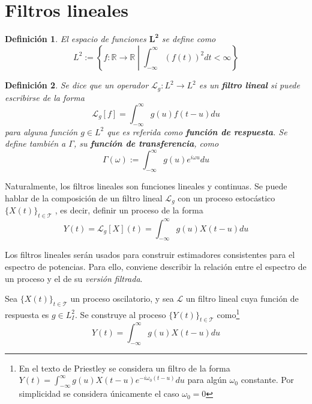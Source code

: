 \documentclass[12pt,letterpaper]{book}
\newtheorem{definicion}{Definición}[chapter]
\newcommand{\R}{\mathbb{R}}
\newcommand{\intR}{\int_{-\infty}^{\infty}}
\newcommand{\xt}{$\{X(t)\}_{t\in \mathcal{T}}$ }
\newcommand{\talque}{\mathrel{}\middle|\mathrel{}}
\newcommand{\lldos}{L^{2}_I}
\begin{document}
\section{Filtros lineales}
\label{sec:lazy_filtros}

\begin{definicion}
El espacio de funciones $\boldsymbol{L}^{\boldsymbol{2}}$ se define como
\begin{equation}
L^2 := \left\{ f:\R\rightarrow\R \talque \intR \left( f(t) \right)^2 dt < \infty \right\}
\end{equation}
\end{definicion}

\begin{definicion}
Se dice que un operador $\mathcal{L}_g : L^{2} \rightarrow L^{2}$ es un \textbf{filtro lineal} si puede escribirse de la forma
\begin{equation}
\mathcal{L}_g[f] = \intR g(u) f(t-u) du
\end{equation}
para alguna función $g\in L^{2}$ que es referida como \textbf{función de respuesta}. Se define también a $\Gamma$, su \textbf{función de transferencia}, como
\begin{equation}
\Gamma (\omega) := \intR g(u) e^{i \omega u} du
\end{equation}
\end{definicion}

Naturalmente, los filtros lineales son funciones lineales y continuas. 
%
%
%
Se puede hablar de la composición de un filtro lineal $\mathcal{L}_g$ con un proceso estocástico \xt, es decir, definir un proceso de la forma
\begin{equation}
Y(t) = \mathcal{L}_g[X](t) =  \intR g(u) X(t-u) du
\label{eq:filtrado}
\end{equation}

Los filtros lineales serán usados para construir estimadores consistentes para el espectro de potencias.
%
Para ello, conviene describir la relación entre el espectro de un proceso y el de su \textit{versión filtrada}.

Sea \xt un proceso oscilatorio, y sea $\mathcal{L}$ un filtro lineal cuya función de respuesta es $g\in \lldos$.
Se construye al proceso $\{Y(t)\}_{t\in \mathcal{T}}$ como\footnote{En el texto de Priestley se considera un filtro de la forma $Y(t) = \intR g(u) X(t-u) e^{-i \omega_0 (t-u)} du$ para algún $\omega_0$ constante. 
%
Por simplicidad se considera únicamente el caso $\omega_0=0$}
\begin{equation}
Y(t) = \intR g(u) X(t-u) du
\end{equation}
\end{document}
